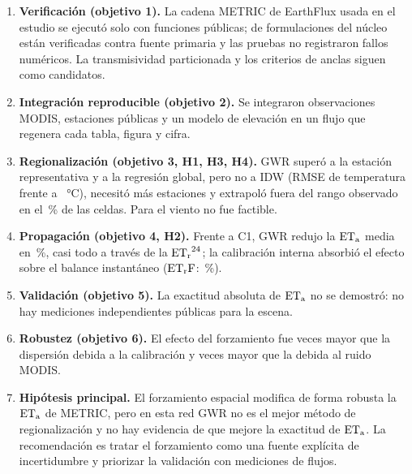 \begin{enumerate}
  \item \textbf{Verificación (objetivo 1).} La cadena METRIC de EarthFlux
  usada en el estudio se ejecutó solo con funciones públicas; \VerVerified{}
  de \VerRows{} formulaciones del núcleo están verificadas contra fuente
  primaria y las pruebas no registraron fallos numéricos. La transmisividad
  particionada y los criterios de anclas siguen como candidatos.
  \item \textbf{Integración reproducible (objetivo 2).} Se integraron
  observaciones MODIS, \NStations{} estaciones públicas y un modelo de
  elevación en un flujo que regenera cada tabla, figura y cifra.
  \item \textbf{Regionalización (objetivo 3, H1, H3, H4).} GWR superó a la
  estación representativa y a la regresión global, pero no a IDW (RMSE de
  temperatura \CVTaCThreeGWRRmse{} frente a \CVTaCTwoIDWRmse~\si{\celsius}),
  necesitó más estaciones y extrapoló fuera del rango observado en el
  \RangeTaCThreeGWRAbove\,\% de las celdas. Para el viento no fue factible.
  \item \textbf{Propagación (objetivo 4, H2).} Frente a C1, GWR redujo la
  $\mathrm{ET_a}$ media en \DEtaCThreeGWRPct\,\%, casi todo a través de la $\mathrm{ET_r}^{24}$;
  la calibración interna absorbió el efecto sobre el balance instantáneo
  ($\mathrm{ET_rF}$: \DEtrfCThreeGWRPct\,\%).
  \item \textbf{Validación (objetivo 5).} La exactitud absoluta de $\mathrm{ET_a}$ no
  se demostró: no hay mediciones independientes públicas para la escena.
  \item \textbf{Robustez (objetivo 6).} El efecto del forzamiento fue
  \RatioSA{} veces mayor que la dispersión debida a la calibración y \RatioSB{}
  veces mayor que la debida al ruido MODIS.
  \item \textbf{Hipótesis principal.} El forzamiento espacial modifica de
  forma robusta la $\mathrm{ET_a}$ de METRIC, pero en esta red GWR no es el mejor
  método de regionalización y no hay evidencia de que mejore la exactitud de
  $\mathrm{ET_a}$. La recomendación es tratar el forzamiento como una fuente explícita
  de incertidumbre y priorizar la validación con mediciones de flujos.
\end{enumerate}

